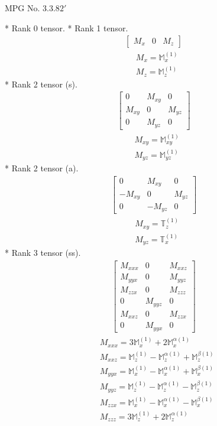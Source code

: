 \documentclass[fleqn,8pt,landscape]{jsarticle}
\begin{document}
\setcounter{MaxMatrixCols}{32}

\renewcommand{\tablename}{Table~}
\renewcommand{\figurename}{Figure~}
\begin{center}
\LARGE
MPG No. 3.3.8\quad$2'$
\end{center}
* Rank 0 tensor.
* Rank 1 tensor.
\begin{align*}
\begin{bmatrix} M_{x} & 0 & M_{z} \end{bmatrix}
\end{align*}
\begin{align*}
& M_{x} = \mathbb{M}_{x}^{(1)} \\
& M_{z} = \mathbb{M}_{z}^{(1)}
\end{align*}
* Rank 2 tensor (s).
\begin{align*}
\begin{bmatrix} 0 & M_{xy} & 0 \\ M_{xy} & 0 & M_{yz} \\ 0 & M_{yz} & 0 \end{bmatrix}
\end{align*}
\begin{align*}
& M_{xy} = \mathbb{M}_{xy}^{(1)} \\
& M_{yz} = \mathbb{M}_{yz}^{(1)}
\end{align*}
* Rank 2 tensor (a).
\begin{align*}
\begin{bmatrix} 0 & M_{xy} & 0 \\ - M_{xy} & 0 & M_{yz} \\ 0 & - M_{yz} & 0 \end{bmatrix}
\end{align*}
\begin{align*}
& M_{xy} = \mathbb{T}_{z}^{(1)} \\
& M_{yz} = \mathbb{T}_{x}^{(1)}
\end{align*}
* Rank 3 tensor (ss).
\begin{align*}
\begin{bmatrix} M_{xxx} & 0 & M_{xxz} \\ M_{yyx} & 0 & M_{yyz} \\ M_{zzx} & 0 & M_{zzz} \\ 0 & M_{yyz} & 0 \\ M_{xxz} & 0 & M_{zzx} \\ 0 & M_{yyx} & 0 \end{bmatrix}
\end{align*}
\begin{align*}
& M_{xxx} = 3 \mathbb{M}_{x}^{(1)} + 2 \mathbb{M}_{x}^{\alpha(1)} \\
& M_{xxz} = \mathbb{M}_{z}^{(1)} - \mathbb{M}_{z}^{\alpha(1)} + \mathbb{M}_{z}^{\beta(1)} \\
& M_{yyx} = \mathbb{M}_{x}^{(1)} - \mathbb{M}_{x}^{\alpha(1)} + \mathbb{M}_{x}^{\beta(1)} \\
& M_{yyz} = \mathbb{M}_{z}^{(1)} - \mathbb{M}_{z}^{\alpha(1)} - \mathbb{M}_{z}^{\beta(1)} \\
& M_{zzx} = \mathbb{M}_{x}^{(1)} - \mathbb{M}_{x}^{\alpha(1)} - \mathbb{M}_{x}^{\beta(1)} \\
& M_{zzz} = 3 \mathbb{M}_{z}^{(1)} + 2 \mathbb{M}_{z}^{\alpha(1)}
\end{align*}
\end{document}
